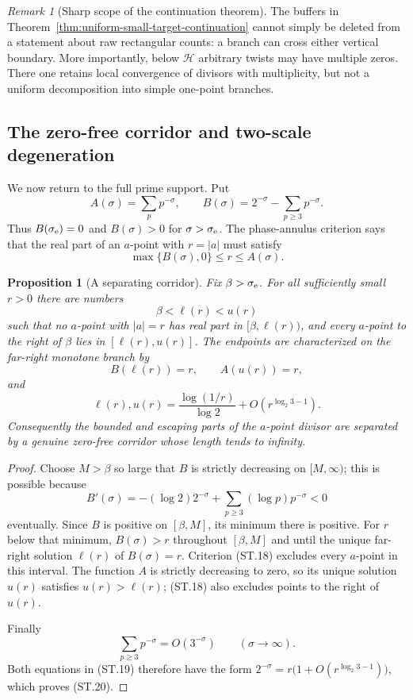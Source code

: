 \documentclass[11pt]{article}
\newtheorem{proposition}[theorem]{Proposition}
\theoremstyle{definition}
\theoremstyle{remark}
\newtheorem{remark}[theorem]{Remark}
\begin{document}
\begin{remark}[Sharp scope of the continuation theorem]
The buffers in Theorem~\ref{thm:uniform-small-target-continuation} cannot simply be
deleted from a statement about raw rectangular counts: a branch can cross either
vertical boundary.  More importantly, below $\mathcal H$ arbitrary twists may have
multiple zeros.  There one retains local convergence of divisors with multiplicity,
but not a uniform decomposition into simple one-point branches.
\end{remark}

\subsection{The zero-free corridor and two-scale degeneration}

We now return to the full prime support.  Put
\[
 A(\sigma)=\sum_pp^{-\sigma},
 \qquad
 B(\sigma)=2^{-\sigma}-\sum_{p\ge3}p^{-\sigma}.
 \tag{ST.17}
\]
Thus $B(\sigma_{\rm e})=0$ and $B(\sigma)>0$ for
$\sigma>\sigma_{\rm e}$.  The phase-annulus criterion says that the real part of an
$a$-point with $r=|a|$ must satisfy
\[
 \max\{B(\sigma),0\}\le r\le A(\sigma).
 \tag{ST.18}
\]

\begin{proposition}[A separating corridor]
\label{prop:small-target-corridor}
Fix $\beta>\sigma_{\rm e}$.  For all sufficiently small $r>0$ there are numbers
\[
 \beta<\ell(r)<u(r)
\]
such that no $a$-point with $|a|=r$ has real part in
$[\beta,\ell(r))$, and every $a$-point to the right of $\beta$ lies in
$[\ell(r),u(r)]$.  The endpoints are characterized on the far-right monotone branch by
\[
 B(\ell(r))=r,
 \qquad
 A(u(r))=r,
 \tag{ST.19}
\]
and
\[
 \ell(r),u(r)
 =\frac{\log(1/r)}{\log2}
   +O\!\left(r^{\log_2 3-1}\right).
 \tag{ST.20}
\]
Consequently the bounded and escaping parts of the $a$-point divisor are separated by
a genuine zero-free corridor whose length tends to infinity.
\end{proposition}

\begin{proof}
Choose $M>\beta$ so large that $B$ is strictly decreasing on $[M,\infty)$; this is
possible because
\[
 B'(\sigma)=-(\log2)2^{-\sigma}
   +\sum_{p\ge3}(\log p)p^{-\sigma}<0
\]
eventually.  Since $B$ is positive on $[\beta,M]$, its minimum there is positive.
For $r$ below that minimum, $B(\sigma)>r$ throughout $[\beta,M]$ and until the unique
far-right solution $\ell(r)$ of $B(\sigma)=r$.  Criterion (ST.18) excludes every
$a$-point in this interval.  The function $A$ is strictly decreasing to zero, so its
unique solution $u(r)$ satisfies $u(r)>\ell(r)$; (ST.18) also excludes points to the
right of $u(r)$.

Finally
\[
 \sum_{p\ge3}p^{-\sigma}=O(3^{-\sigma})
 \qquad(\sigma\to\infty).
\]
Both equations in (ST.19) therefore have the form
$2^{-\sigma}=r\bigl(1+O(r^{\log_2 3-1})\bigr)$, which proves (ST.20).
\end{proof}
\end{document}

